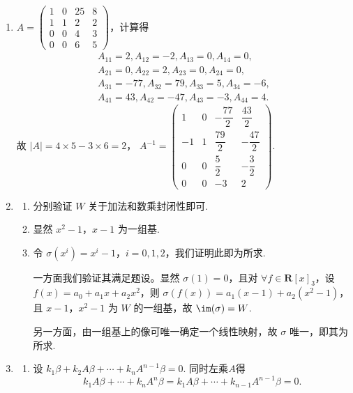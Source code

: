 \begin{enumerate}
    \item \(A=\begin{pmatrix}
    1 & 0 & 25 & 8 \\
    1 & 1 & 2 & 2 \\
    0 & 0 & 4 & 3 \\
    0 & 0 & 6 & 5
    \end{pmatrix}\)，计算得
    \begin{gather*}
        A_{11}=2, A_{12}=-2, A_{13}=0, A_{14}=0, \\
        A_{21}=0, A_{22}=2, A_{23}=0, A_{24}=0, \\
        A_{31}=-77, A_{32}=79, A_{33}=5, A_{34}=-6, \\
        A_{41}=43, A_{42}=-47, A_{43}=-3, A_{44}=4.
    \end{gather*}
    故
    \(\vert A\vert = 4\times5 - 3\times6 = 2\)，
    \(A^{-1}=\begin{pmatrix}
        1 & 0 & -\dfrac{77}{2} & \dfrac{43}{2} \\[0.5em]
        -1 & 1 & \dfrac{79}{2} & -\dfrac{47}{2} \\[0.5em]
        0 & 0 & \dfrac{5}{2} & -\dfrac{3}{2} \\
        0 & 0 & -3 & 2
    \end{pmatrix}\).
    \item
    \begin{enumerate}
        \item 分别验证 \(W\) 关于加法和数乘封闭性即可.
        \item 显然 \(x^{2}-1\)，\(x - 1\) 为一组基.
        \item 令 \(\sigma(x^{i})=x^{i}-1\)，\(i = 0,1,2\)，我们证明此即为所求.

        一方面我们验证其满足题设。显然 \(\sigma(1)=0\)，且对 \(\forall f \in \mathbf{R}[x]_{3}\)，设 \(f(x)=a_{0}+a_{1}x+a_{2}x^{2}\)，则 \(\sigma(f(x))=a_{1}(x - 1)+a_{2}(x^{2}-1)\)，且 \(x - 1\)，\(x^{2}-1\) 为 \(W\) 的一组基，故 \(\im(\sigma)=W\).

        另一方面，由一组基上的像可唯一确定一个线性映射，故 \(\sigma\) 唯一，即其为所求.
    \end{enumerate}

    \item
    \begin{enumerate}
        \item 设 \(k_1\beta+k_2 A\beta+\cdots + k_nA^{n-1}\beta=0\). 同时左乘\(A\)得 \[ k_1 A\beta+\cdots+k_n A^n\beta=k_1 A\beta+\cdots+k_{n-1} A^{n-1}\beta=0. \]


\end{enumerate}
\end{enumerate}
